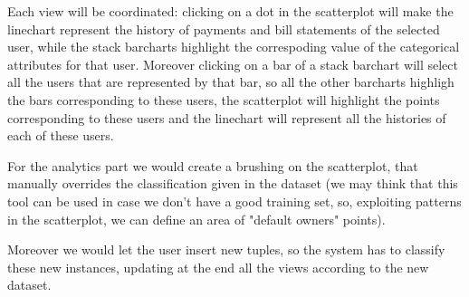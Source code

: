\documentclass{article}
\begin{document}
Each view will be coordinated: clicking on a dot in the scatterplot will make the linechart represent the history of payments and bill statements of the selected user, while the stack barcharts highlight the correspoding value of the categorical attributes for that user.
Moreover clicking on a bar of a stack barchart will select all the users that are represented by that bar, so all the other barcharts highligh the bars corresponding to these users, the scatterplot will highlight the points corresponding to these users and the linechart will
represent all the histories of each of these users.

For the analytics part we would create a brushing on the scatterplot, that manually overrides the classification given in the dataset (we may think that this tool can be used in case we don't have a good training set, so, exploiting patterns in the scatterplot, we can define an area of "default owners" points).

Moreover we would let the user insert new tuples, so the system has to classify these new instances, updating at the end all the views according to the new dataset.
\end{document}
